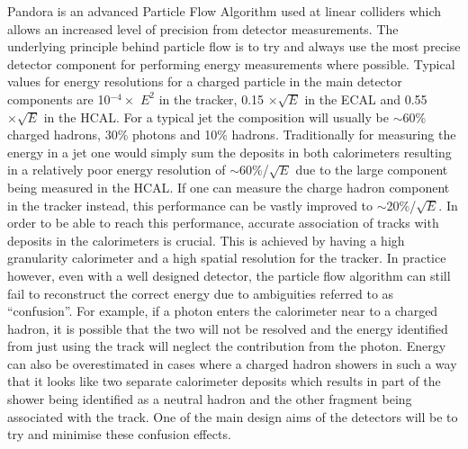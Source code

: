 Pandora\cite{Thomson200925} is an advanced Particle Flow Algorithm used at linear colliders which allows an increased level of precision from detector measurements. The underlying principle behind particle flow is to try and always use the most precise detector component for performing energy measurements where possible. Typical values for energy resolutions for a charged particle in the main detector components are 10$^{-4} \times$ $E^2$ in the tracker, 0.15 $\times \sqrt{E}$ in the \ac{ECAL} and 0.55 $\times \sqrt{E}$ in the \ac{HCAL}. For a typical jet the composition will usually be $\sim$60\% charged hadrons, 30\% photons and 10\% hadrons. Traditionally for measuring the energy in a jet one would simply sum the deposits in both calorimeters resulting in a relatively poor energy resolution of $\sim$60\%/$\sqrt{E}$ due to the large component being measured in the \ac{HCAL}. If one can measure the charge hadron component in the tracker instead, this performance can be vastly improved to $\sim$20\%/$\sqrt{E}$. In order to be able to reach this performance, accurate association of tracks with deposits in the calorimeters is crucial. This is achieved by having a high granularity calorimeter and a high spatial resolution for the tracker. In practice however, even with a well designed detector, the particle flow algorithm can still fail to reconstruct the correct energy due to ambiguities referred to as ``confusion''. For example, if a photon enters the calorimeter near to a charged hadron, it is possible that the two will not be resolved and the energy identified from just using the track will neglect the contribution from the photon. Energy can also be overestimated in cases where a charged hadron showers in such a way that it looks like two separate calorimeter deposits which results in part of the shower being identified as a neutral hadron and the other fragment being associated with the track. One of the main design aims of the detectors will be to try and minimise these confusion effects. 


